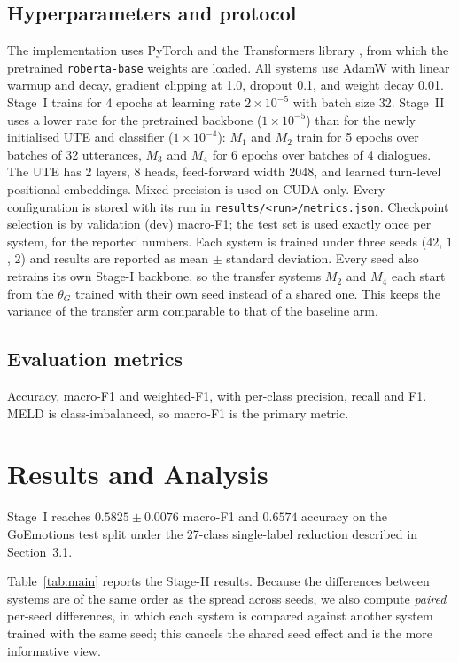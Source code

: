 \documentclass[sigconf,nonacm]{acmart}
\begin{document}
\subsection{Hyperparameters and protocol}
The implementation uses PyTorch \citep{paszke2019pytorch} and the Transformers library
\citep{wolf2020transformers}, from which the pretrained \texttt{roberta-base} weights are
loaded. All systems use AdamW with linear warmup and decay, gradient clipping at 1.0, dropout 0.1,
and weight decay 0.01. Stage~I trains for 4 epochs at learning rate $2\times10^{-5}$ with
batch size 32. Stage~II uses a lower rate for the pretrained backbone
($1\times10^{-5}$) than for the newly initialised UTE and classifier
($1\times10^{-4}$): $M_1$ and $M_2$ train for 5 epochs over batches of 32 utterances,
$M_3$ and $M_4$ for 6 epochs over batches of 4 dialogues. The UTE has 2 layers, 8 heads,
feed-forward width 2048, and learned turn-level positional embeddings. Mixed precision is
used on CUDA only. Every configuration is stored with its run in
\texttt{results/<run>/metrics.json}. Checkpoint selection is by validation (dev) macro-F1;
the test set is used exactly once per system, for the reported numbers. Each system is
trained under three seeds ($42$, $1$, $2$) and results are reported as mean $\pm$ standard
deviation. Every seed also retrains its own Stage-I backbone, so the transfer systems
$M_2$ and $M_4$ each start from the $\theta_G$ trained with their own seed instead of a
shared one. This keeps the variance of the transfer arm comparable to that of the baseline arm.

\subsection{Evaluation metrics}
Accuracy, macro-F1 and weighted-F1, with per-class precision, recall and F1. MELD is
class-imbalanced, so macro-F1 is the primary metric.

\section{Results and Analysis}


Stage~I reaches $0.5825 \pm 0.0076$ macro-F1 and $0.6574$ accuracy on the GoEmotions test
split under the 27-class single-label reduction described in Section~3.1.

Table~\ref{tab:main} reports the Stage-II results. Because the differences between systems
are of the same order as the spread across seeds, we also compute \emph{paired} per-seed
differences, in which each system is compared against another system trained with the same
seed; this cancels the shared seed effect and is the more informative view.
\end{document}

